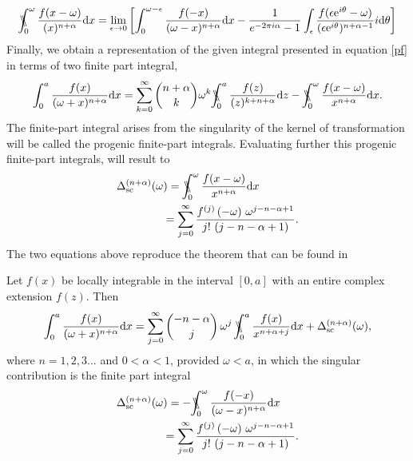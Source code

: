 \begin{equation}
\bbint{0}{\omega}\frac{f(x-\omega)}{(x)^{n+\alpha}}\mathrm{d}x=\lim_{\epsilon\rightarrow0}\left[\int_{0}^{\omega-\epsilon}\frac{f(-x)}{(\omega-x)^{n+\alpha}}\mathrm{d}x-\frac{1}{e^{-2\pi i\alpha}-1} \int_{\epsilon}\frac{f(\epsilon \mathrm{e}^{i\theta} - \omega)}{(\epsilon \mathrm{e}^{i\theta})^{n+\alpha-1}}i\mathrm{d}\theta \right]
\end{equation}
Finally, we obtain a representation of the given integral presented in equation \eqref{pf} in terms of two finite part integral,
\begin{equation}\label{new}
\int_{0}^{a}\frac{f(x)}{(\omega+x)^{n+\alpha}}\mathrm{d}x=\sum_{k=0}^{\infty} {n+\alpha \choose k} \omega^{k} \bbint{0}{a} \frac{f(z)}{(z)^{k+n+\alpha}}\mathrm{d}z -\bbint{0}{\omega}\frac{f(x-\omega)}{x^{n+\alpha}}\mathrm{d}x.
\end{equation}
The finite-part integral arises from the singularity of the kernel of transformation will be called the progenic finite-part integrals. Evaluating further this progenic finite-part integrals, will result to
\begin{align}
\begin{split}
	\Delta_{\mathrm{sc}}^{(n+\alpha)} & (\omega) = \bbint{0}{\omega}\frac{f(x-\omega)}{x^{n+\alpha}}\mathrm{d}x
	\\& \quad= \sum_{j=0}^{\infty}\frac{f^{\left(j\right)}\left(-\omega\right) \,\omega^{j-n-\alpha+1}}{j!\,\left(j-n-\alpha+1\right)} .
\end{split}
\end{align}
The two equations above reproduce the theorem that can be found in \cite{tica2019finite}
\begin{theorem}\label{T3.5}
	Let $f(x)$ be locally integrable in the interval $[0,a]$ with an entire complex extension $f(z)$. Then
	\begin{equation}\label{new_rezult}
	\int_0^a\frac{f(x)}{(\omega+x)^{n+\alpha}}\mathrm{d}x=\sum_{j=0}^{\infty}{{-n-\alpha}\choose {j}}\, {\omega}^j \, \bbint{0}{a}\frac{f(x)}{x^{n+\alpha+j}}\mathrm{d}x + \Delta_{\mathrm{sc}}^{(n+\alpha)}(\omega),
	\end{equation}
	where $n=1,2,3...$ and $0<\alpha<1$, provided $\omega<a$, in which the singular contribution is the finite part integral
	\begin{align}
    \begin{split}\label{3.79}
	\Delta_{\mathrm{sc}}^{(n+\alpha)} & (\omega) =- \bbint{0}{\omega} \frac{f(-x)}{(\omega-x)^{n+\alpha}}\mathrm{d}x
	\\& \quad= \sum_{j=0}^{\infty}\frac{f^{\left(j\right)}\left(-\omega\right) \,\omega^{j-n-\alpha+1}}{j!\,\left(j-n-\alpha+1\right)} .
	\end{split}
    \end{align}
\end{theorem}

